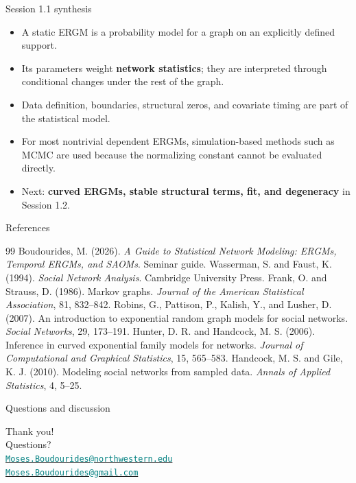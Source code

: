 \documentclass[aspectratio=169,11pt]{beamer}
\newcommand{\term}[1]{\textbf{\color{nupurple}#1}}
\begin{document}
\begin{frame}{Session 1.1 synthesis}
\begin{itemize}
\item A static ERGM is a probability model for a graph on an explicitly defined support.
\item Its parameters weight \term{network statistics}; they are interpreted through conditional changes under the rest of the graph.
\item Data definition, boundaries, structural zeros, and covariate timing are part of the statistical model.
\item For most nontrivial dependent ERGMs, simulation-based methods such as MCMC are used because the normalizing constant cannot be evaluated directly.
\item Next: \term{curved ERGMs, stable structural terms, fit, and degeneracy} in Session 1.2.
\end{itemize}
\end{frame}

\begin{frame}{References}
\footnotesize
\begin{thebibliography}{99}
 Boudourides, M. (2026). \emph{A Guide to Statistical Network Modeling: ERGMs, Temporal ERGMs, and SAOMs}. Seminar guide.
 Wasserman, S. and Faust, K. (1994). \emph{Social Network Analysis}. Cambridge University Press.
 Frank, O. and Strauss, D. (1986). Markov graphs. \emph{Journal of the American Statistical Association}, 81, 832--842.
 Robins, G., Pattison, P., Kalish, Y., and Lusher, D. (2007). An introduction to exponential random graph models for social networks. \emph{Social Networks}, 29, 173--191.
 Hunter, D. R. and Handcock, M. S. (2006). Inference in curved exponential family models for networks. \emph{Journal of Computational and Graphical Statistics}, 15, 565--583.
 Handcock, M. S. and Gile, K. J. (2010). Modeling social networks from sampled data. \emph{Annals of Applied Statistics}, 4, 5--25.
\end{thebibliography}
\end{frame}

\begin{frame}{Questions and discussion}
\begin{center}
\Large{Thank you!}\\[2ex]
\normalsize{Questions?}\\[5ex]
\href{mailto:Moses.Boudourides@northwestern.edu}{\textcolor{teal}{\small\texttt{Moses.Boudourides@northwestern.edu}}}\\[0.8em]
\href{mailto:Moses.Boudourides@gmail.com}{\textcolor{teal}{\small\texttt{Moses.Boudourides@gmail.com}}}
\end{center}
\end{frame}

\end{document}
